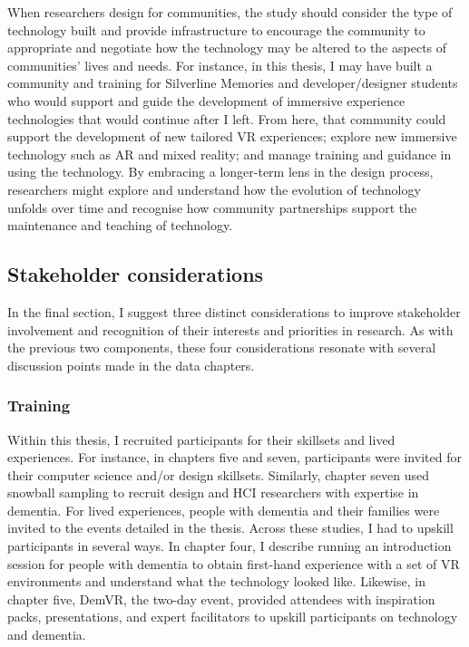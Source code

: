 When researchers design for communities, the study should consider the type of technology built and provide infrastructure to encourage the community to appropriate and negotiate how the technology may be altered to the aspects of communities’ lives and needs. For instance, in this thesis, I may have built a community and training for Silverline Memories and developer/designer students who would support and guide the development of immersive experience technologies that would continue after I left. From here, that community could support the development of new tailored VR experiences; explore new immersive technology such as AR and mixed reality; and manage training and guidance in using the technology. By embracing a longer-term lens in the design process, researchers might explore and understand how the evolution of technology unfolds over time and recognise how community partnerships support the maintenance and teaching of technology.

\subsection{Stakeholder considerations}
\label{StakeholderConsideration}
In the final section, I suggest three distinct considerations to improve stakeholder involvement and recognition of their interests and priorities in research. As with the previous two components, these four considerations resonate with several discussion points made in the data chapters.

\subsubsection{Training}
\label{Training}
Within this thesis, I recruited participants for their skillsets and lived experiences. For instance, in chapters five and seven, participants were invited for their computer science and/or design skillsets. Similarly, chapter seven used snowball sampling to recruit design and HCI researchers with expertise in dementia. For lived experiences, people with dementia and their families were invited to the events detailed in the thesis. Across these studies, I had to upskill participants in several ways. In chapter four, I describe running an introduction session for people with dementia to obtain first-hand experience with a set of VR environments and understand what the technology looked like. Likewise, in chapter five, DemVR, the two-day event, provided attendees with inspiration packs, presentations, and expert facilitators to upskill participants on technology and dementia. 

